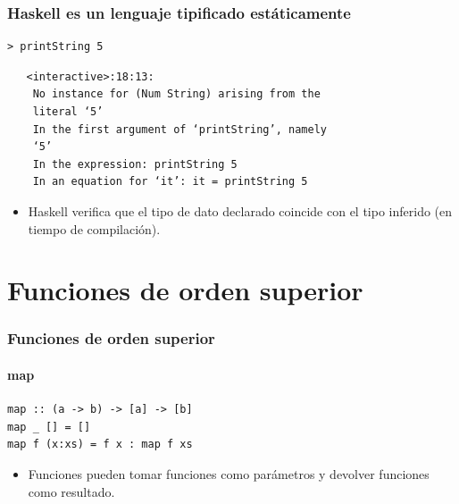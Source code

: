 \documentclass{beamer}
\begin{document}
\begin{frame}[fragile]
  \frametitle{Haskell es un lenguaje tipificado estáticamente}

\begin{lstlisting}[numbers=none, backgroundcolor=\color{lightgray}, keywordstyle=\color{black}]
> printString 5
\end{lstlisting}

{\color{red} 
\begin{verbatim}
   <interactive>:18:13:
    No instance for (Num String) arising from the 
    literal ‘5’
    In the first argument of ‘printString’, namely 
    ‘5’
    In the expression: printString 5
    In an equation for ‘it’: it = printString 5
\end{verbatim}}

\vspace{0.3cm}

\begin{itemize}
\item Haskell verifica que el tipo de dato declarado coincide con el tipo inferido (en tiempo de compilación). 
\end{itemize}

\end{frame}


\section{Funciones de orden superior}

\begin{frame}[fragile]
  \frametitle{Funciones de orden superior}
  \framesubtitle{map}

\begin{lstlisting}
map :: (a -> b) -> [a] -> [b]
map _ [] = []
map f (x:xs) = f x : map f xs
\end{lstlisting}

\vspace{0.3cm}

\begin{itemize}
\item Funciones pueden tomar funciones como parámetros y devolver funciones como resultado.
\end{itemize}

\end{frame}

\end{document}
